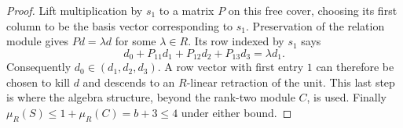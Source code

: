 \begin{proof}
Lift multiplication by $s_1$ to a matrix $P$ on this free cover,
choosing its first column to be the basis vector corresponding
to $s_1$.  Preservation of the relation module gives $Pd=\lambda d$
for some $\lambda\in R$.  Its row indexed by $s_1$ says
\[
 d_0+P_{11}d_1+P_{12}d_2+P_{13}d_3=\lambda d_1.
\]
Consequently $d_0\in(d_1,d_2,d_3)$.  A row vector with first
entry $1$ can therefore be chosen to kill $d$ and descends to
an $R$-linear retraction of the unit.  This last step is where
the algebra structure, beyond the rank-two module $C$, is used.
Finally $\mu_R(S)\leq1+\mu_R(C)=b+3\leq4$ under either bound.
\end{proof}
